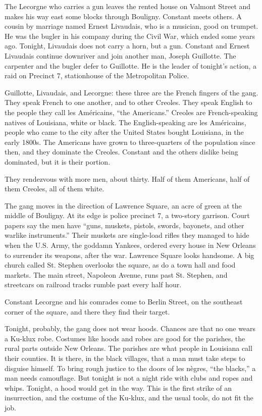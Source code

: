 The Lecorgne who carries a gun leaves the rented house on Valmont Street
and makes his way east some blocks through Bouligny. Constant meets
others. A cousin by marriage named Ernest Livaudais, who is a musician,
good on trumpet. He was the bugler in his company during the Civil War,
which ended some years ago. Tonight, Livaudais does not carry a horn,
but a gun. Constant and Ernest Livaudais continue downriver and join
another man, Joseph Guillotte. The carpenter and the bugler defer to
Guillotte. He is the leader of tonight's action, a raid on Precinct 7,
stationhouse of the Metropolitan Police.

Guillotte, Livaudais, and Lecorgne: these three are the French fingers
of the gang. They speak French to one another, and to other Creoles.
They speak English to the people they call les Américains, ``the
Americans.'' Creoles are French-speaking natives of Louisiana, white or
black. The English-speaking are les Américains, people who came to the
city after the United States bought Louisiana, in the early 1800s. The
Americans have grown to three-quarters of the population since then, and
they dominate the Creoles. Constant and the others dislike being
dominated, but it is their portion.

They rendezvous with more men, about thirty. Half of them Americans,
half of them Creoles, all of them white.

The gang moves in the direction of Lawrence Square, an acre of green at
the middle of Bouligny. At its edge is police precinct 7, a two-story
garrison. Court papers say the men have ``guns, muskets, pistols,
swords, bayonets, and other warlike instruments.'' Their muskets are
single-load rifles they managed to hide when the U.S. Army, the goddamn
Yankees, ordered every house in New Orleans to surrender its weapons,
after the war. Lawrence Square looks handsome. A big church called St.
Stephen overlooks the square, as do a town hall and food markets. The
main street, Napoleon Avenue, runs past St. Stephen, and streetcars on
railroad tracks rumble past every half hour.

Constant Lecorgne and his comrades come to Berlin Street, on the
southeast corner of the square, and there they find their target.

Tonight, probably, the gang does not wear hoods. Chances are that no one
wears a Ku-klux robe. Costumes like hoods and robes are good for the
parishes, the rural parts outside New Orleans. The parishes are what
people in Louisiana call their counties. It is there, in the black
villages, that a man must take steps to disguise himself. To bring rough
justice to the doors of les nègres, ``the blacks,'' a man needs
camouflage. But tonight is not a night ride with clubs and ropes and
whips. Tonight, a hood would get in the way. This is the first strike of
an insurrection, and the costume of the Ku-klux, and the usual tools, do
not fit the job.

